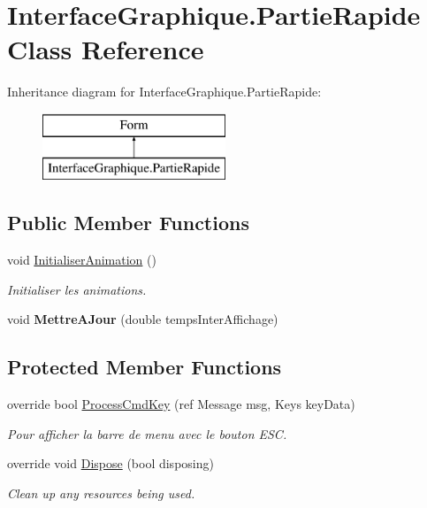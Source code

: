 \hypertarget{class_interface_graphique_1_1_partie_rapide}{}\section{Interface\+Graphique.\+Partie\+Rapide Class Reference}
\label{class_interface_graphique_1_1_partie_rapide}
Inheritance diagram for Interface\+Graphique.\+Partie\+Rapide\+:\begin{figure}[H]
\begin{center}
\leavevmode
\includegraphics[height=2.000000cm]{class_interface_graphique_1_1_partie_rapide}
\end{center}
\end{figure}
\subsection*{Public Member Functions}
\begin{DoxyCompactItemize}
\item 
void \hyperlink{group__inf2990_gaf5ff96f0fca70376fe5e1a69565eb592}{Initialiser\+Animation} ()
\begin{DoxyCompactList}\small\item\em Initialiser les animations. \end{DoxyCompactList}\item 
void {\bfseries Mettre\+A\+Jour} (double temps\+Inter\+Affichage)
\end{DoxyCompactItemize}
\subsection*{Protected Member Functions}
\begin{DoxyCompactItemize}
\item 
override bool \hyperlink{group__inf2990_ga7dac506aec410200b7f6600ecf06b57b}{Process\+Cmd\+Key} (ref Message msg, Keys key\+Data)
\begin{DoxyCompactList}\small\item\em Pour afficher la barre de menu avec le bouton E\+SC. \end{DoxyCompactList}\item 
override void \hyperlink{class_interface_graphique_1_1_partie_rapide_a248957e40a9fe9d9ca2e3c90e117b192}{Dispose} (bool disposing)
\begin{DoxyCompactList}\small\item\em Clean up any resources being used. \end{DoxyCompactList}\end{DoxyCompactItemize}


